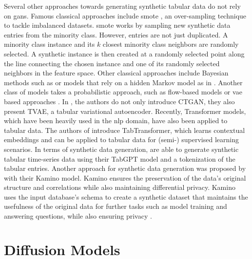 Several other approaches towards generating synthetic tabular data do not rely on \glspl{gan}.
Famous classical approaches include \gls{smote} \cite{chawla2002SMOTESyntheticMinority}, an over-sampling technique to tackle imbalanced datasets.
\gls{smote} works by sampling new synthetic data entries from the minority class.
However, entries are not just duplicated.
A minority class instance and its $k$ closest minority class neighbors are randomly selected. 
A synthetic instance is then created at a randomly selected point along the line connecting the chosen instance and one of its randomly selected neighbors in the feature space.
Other classical approaches include Bayesian methods such as \cite{zhang2017PrivBayesPrivateData} or \glspl{model} that rely on a hidden Markov \gls{model} as in \cite{dahmen2019SynSysSyntheticData}.
Another class of \glspl{model} takes a probabilistic approach, such as flow-based \glspl{model} \cite{kamthe2021CopulaFlowsSynthetic} or \gls{vae} based approaches \cite{kingma2013AutoEncodingVariationalBayes}.
In \cite{xu2019ModelingTabularData}, the authors do not only introduce CTGAN, they also present TVAE, a tabular variational autoencoder.
Recently, Transformer \glspl{model}, which have been heavily used in the \gls{nlp} domain, have also been applied to tabular data.
The authors of \cite{huang2020TabTransformerTabularData} introduce TabTransformer, which learns contextual embeddings and can be applied to tabular data for (semi-) supervised learning scenarios.
In terms of synthetic data generation, \textcite{padhi2021TabularTransformersModeling} are able to generate synthetic tabular time-series data using their TabGPT \gls{model} and a tokenization of the tabular entries.
Another approach for synthetic data generation was proposed by \textcite{ge2021KaminoConstraintawareDifferentially} with their Kamino \gls{model}.
Kamino ensures the preservation of the data's original structure and correlations while also maintaining differential privacy. 
Kamino uses the input database's schema to create a synthetic dataset that maintains the usefulness of the original data for further tasks such as \gls{model} training and answering questions, while also ensuring privacy \cite{ge2021KaminoConstraintawareDifferentially}.

\section{Diffusion Models}
\label{ch:relatedWork-diffusionModels}

